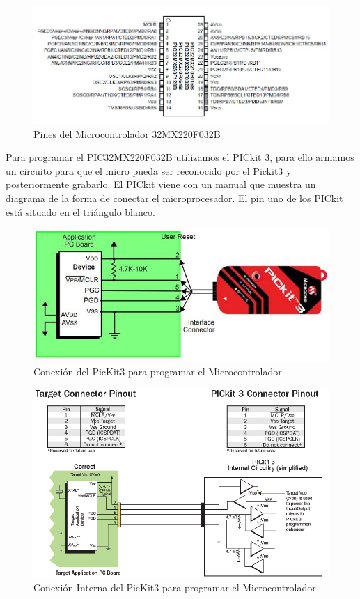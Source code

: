 \documentclass[12pt,letterpaper,twoside]{book}
\begin{document}
\begin{figure}
\centering
\includegraphics[width=4.5in]{32MX220F032B.jpg}
\caption{Pines del Microcontrolador 32MX220F032B}
\label{fig1}
\end{figure}

Para programar el PIC32MX220F032B utilizamos el PICkit 3, para ello  armamos un circuito para que el micro pueda ser reconocido por el Pickit3 y posteriormente grabarlo. El PICkit viene con un manual que muestra un diagrama de la forma de conectar el microprocesador. El pin uno de los PICkit está situado en el triángulo blanco. 

\begin{figure}
\centering
\includegraphics[width=5in]{Pickit3.jpg}
\caption{Conexión del PicKit3 para programar el Microcontrolador}
\label{fig2}
\end{figure}


\begin{figure}
\centering
\includegraphics[width=5in]{conexionPickit3.jpg}
\caption{Conexión Interna del PicKit3 para programar el Microcontrolador}
\label{fig3}
\end{figure}
\end{document}
